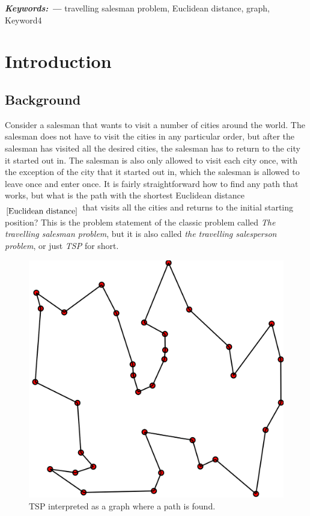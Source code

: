 \documentclass{article}
\providecommand{\keywords}[1]{\textbf{\textit{Keywords: ---}} #1}%
\begin{document}
\keywords{travelling salesman problem, Euclidean distance, graph, Keyword4}



\thispagestyle{empty} 
\newpage

\tableofcontents
\thispagestyle{empty} 
\newpage


\section{Introduction}\label{Introduction}

\subsection{Background}\label{Background}
Consider a salesman that wants to visit a number of cities around the world. The salesman does not have to visit the cities in any particular order, but after the salesman has visited all the desired cities, the salesman has to return to the city it started out in. The salesman is also only allowed to visit each city once, with the exception of the city that it started out in, which the salesman is allowed to leave once and enter once. It is fairly straightforward how to find any path that works, but what is the path with the shortest Euclidean distance$_{\ref{Euclidean distance}}$ that visits all the cities and returns to the initial starting position?
This is the problem statement of the classic problem called \textit{The travelling salesman problem}, but it is also called \textit{the travelling salesperson problem}, or just \textit{TSP} for short.


\begin{figure}[ht]
 \centering
 \includegraphics[scale=.15]{docs/pictures/tsp.png}
 \caption{TSP interpreted as a graph where a path is found. \cite{wiki:TSP}}
 \label{Figure:TSP-as-graph}
\end{figure}
\end{document}
